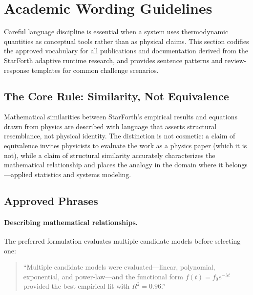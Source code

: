 
\section{Academic Wording Guidelines}

Careful language discipline is essential when a system uses thermodynamic
quantities as conceptual tools rather than as physical claims. This section
codifies the approved vocabulary for all publications and documentation
derived from the StarForth adaptive runtime research, and provides sentence
patterns and review-response templates for common challenge scenarios.

\subsection{The Core Rule: Similarity, Not Equivalence}

Mathematical similarities between StarForth's empirical results and equations
drawn from physics are described with language that asserts structural
resemblance, not physical identity. The distinction is not cosmetic: a claim
of equivalence invites physicists to evaluate the work as a physics paper
(which it is not), while a claim of structural similarity accurately
characterizes the mathematical relationship and places the analogy in the
domain where it belongs---applied statistics and systems modeling.

\subsection{Approved Phrases}

\paragraph{Describing mathematical relationships.}
The preferred formulation evaluates multiple candidate models before selecting
one:

\begin{quote}
``Multiple candidate models were evaluated---linear, polynomial,
exponential, and power-law---and the functional form $f(t) = f_0
e^{-\lambda t}$ provided the best empirical fit with $R^2 = 0.96$.''
\end{quote}

